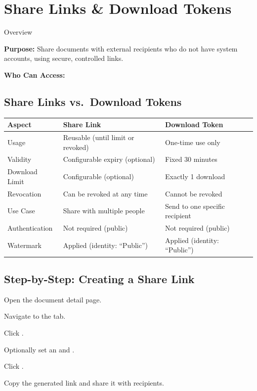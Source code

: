 \section{Share Links \& Download Tokens}

\begin{ugModule}{Overview}

  \textbf{Purpose:}
  Share documents with external recipients who do not have
  system accounts, using secure, controlled links.

  \textbf{Who Can Access:}
   
\end{ugModule}

\subsection{Share Links vs.\ Download Tokens}

\begin{tabularx}{\textwidth}{@{} l X X @{}}
  \toprule
  \textbf{Aspect} & \textbf{Share Link}
    & \textbf{Download Token} \\
  \midrule
  Usage
    & Reusable (until limit or revoked)
    & One-time use only \\
  Validity
    & Configurable expiry (optional)
    & Fixed 30 minutes \\
  Download Limit
    & Configurable (optional)
    & Exactly 1 download \\
  Revocation
    & Can be revoked at any time
    & Cannot be revoked \\
  Use Case
    & Share with multiple people
    & Send to one specific recipient \\
  Authentication
    & Not required (public)
    & Not required (public) \\
  Watermark
    & Applied (identity: ``Public'')
    & Applied (identity: ``Public'') \\
  \bottomrule
\end{tabularx}

\subsection{Step-by-Step: Creating a Share Link}
\begin{ugSteps}
  \item Open the document detail page.
  \item Navigate to the  tab.
  \item Click .
  \item Optionally set an  and
        .
  \item Click .
  \item Copy the generated link and share it with recipients.
\end{ugSteps}

